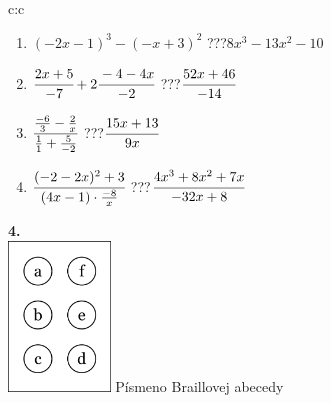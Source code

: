\documentclass[10pt]{report}
\begin{document}
\begin{tabular}{c:c}
\begin{minipage}[c][104.5mm][t]{0.5\linewidth}
\begin{center}
\begin{minipage}{0.79\linewidth}
\begin{center}
\begin{varwidth}{\linewidth}
\begin{enumerate}
\item $(-2x-1)^3-(-x+3)^2$\quad \dotfill\; ???\;\dotfill \quad $8x^3-13x^2-10$
\item $\cfrac{2x+5}{-7}+2\cfrac{-4-4x}{-2}$\quad \dotfill\; ???\;\dotfill \quad $\cfrac{52x+46}{-14}$
\item $\cfrac{\frac{-6}{3}-\frac{2}{x}}{\frac{1}{1}+\frac{5}{-2}}$\quad \dotfill\; ???\;\dotfill \quad $\cfrac{15x+13}{9x}$
\item $\cfrac{(-2-2x)^2+3}{(4x-1)\cdot\frac{-8}{x}}$\quad \dotfill\; ???\;\dotfill \quad $\cfrac{4x^3+8x^2+7x}{-32x+8}$
\end{enumerate}
\end{varwidth}
\end{center}
\end{minipage}
\begin{minipage}{0.20\linewidth}
\begin{center}
{\Huge\bfseries 4.} \\[2mm]
\includegraphics[height=40mm]{../images/braille.png}
{\small Písmeno Braillovej abecedy}
\end{center}
\end{minipage}
\end{center}
\end{minipage}
%
\end{tabular}
\newpage
\thispagestyle{empty}
\end{document}
